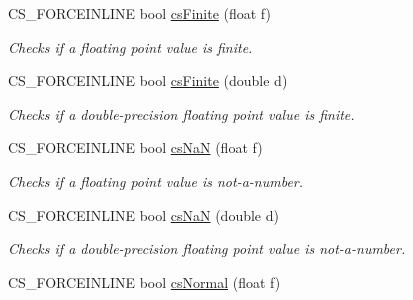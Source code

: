 \begin{DoxyCompactItemize}
\item 
C\+S\+\_\+\+F\+O\+R\+C\+E\+I\+N\+L\+I\+NE bool \hyperlink{group__geom__utils_ga9f09b774d5cca1884a80213a91d84b64}{cs\+Finite} (float f)\hypertarget{group__geom__utils_ga9f09b774d5cca1884a80213a91d84b64}{}\label{group__geom__utils_ga9f09b774d5cca1884a80213a91d84b64}

\begin{DoxyCompactList}\small\item\em Checks if a floating point value is finite. \end{DoxyCompactList}\item 
C\+S\+\_\+\+F\+O\+R\+C\+E\+I\+N\+L\+I\+NE bool \hyperlink{group__geom__utils_ga4cd283243ebdd16050674317314df026}{cs\+Finite} (double d)\hypertarget{group__geom__utils_ga4cd283243ebdd16050674317314df026}{}\label{group__geom__utils_ga4cd283243ebdd16050674317314df026}

\begin{DoxyCompactList}\small\item\em Checks if a double-\/precision floating point value is finite. \end{DoxyCompactList}\item 
C\+S\+\_\+\+F\+O\+R\+C\+E\+I\+N\+L\+I\+NE bool \hyperlink{group__geom__utils_gaed49a33b4a87f5efa741888aaf9c5eca}{cs\+NaN} (float f)\hypertarget{group__geom__utils_gaed49a33b4a87f5efa741888aaf9c5eca}{}\label{group__geom__utils_gaed49a33b4a87f5efa741888aaf9c5eca}

\begin{DoxyCompactList}\small\item\em Checks if a floating point value is not-\/a-\/number. \end{DoxyCompactList}\item 
C\+S\+\_\+\+F\+O\+R\+C\+E\+I\+N\+L\+I\+NE bool \hyperlink{group__geom__utils_gac302c6cf13d5219407a1502838dfc1bf}{cs\+NaN} (double d)\hypertarget{group__geom__utils_gac302c6cf13d5219407a1502838dfc1bf}{}\label{group__geom__utils_gac302c6cf13d5219407a1502838dfc1bf}

\begin{DoxyCompactList}\small\item\em Checks if a double-\/precision floating point value is not-\/a-\/number. \end{DoxyCompactList}\item 
C\+S\+\_\+\+F\+O\+R\+C\+E\+I\+N\+L\+I\+NE bool \hyperlink{group__geom__utils_gaca1dc0177b20035712ee9144abdd41f1}{cs\+Normal} (float f)\hypertarget{group__geom__utils_gaca1dc0177b20035712ee9144abdd41f1}{}\label{group__geom__utils_gaca1dc0177b20035712ee9144abdd41f1}


\end{DoxyCompactItemize}
